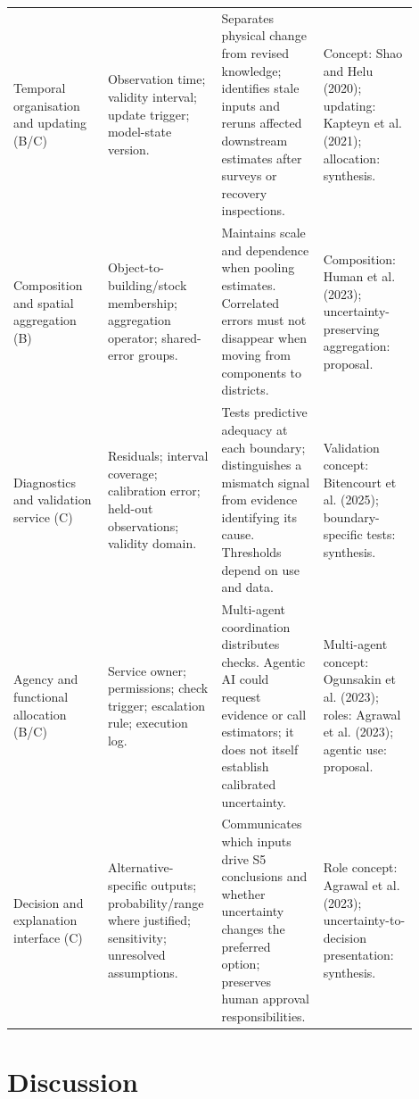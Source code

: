\begin{longtable}{p{0.225\linewidth}p{0.225\linewidth}p{0.225\linewidth}p{0.225\linewidth}}
Temporal organisation and updating (B/C) & Observation time; validity interval; update trigger; model-state version. & Separates physical change from revised knowledge; identifies stale inputs and reruns affected downstream estimates after surveys or recovery inspections. & Concept: Shao and Helu (2020); updating: Kapteyn et al. (2021); allocation: synthesis.\\
Composition and spatial aggregation (B) & Object-to-building/stock membership; aggregation operator; shared-error groups. & Maintains scale and dependence when pooling estimates. Correlated errors must not disappear when moving from components to districts. & Composition: Human et al. (2023); uncertainty-preserving aggregation: proposal.\\
Diagnostics and validation service (C) & Residuals; interval coverage; calibration error; held-out observations; validity domain. & Tests predictive adequacy at each boundary; distinguishes a mismatch signal from evidence identifying its cause. Thresholds depend on use and data. & Validation concept: Bitencourt et al. (2025); boundary-specific tests: synthesis.\\
Agency and functional allocation (B/C) & Service owner; permissions; check trigger; escalation rule; execution log. & Multi-agent coordination distributes checks. Agentic AI could request evidence or call estimators; it does not itself establish calibrated uncertainty. & Multi-agent concept: Ogunsakin et al. (2023); roles: Agrawal et al. (2023); agentic use: proposal.\\
Decision and explanation interface (C) & Alternative-specific outputs; probability/range where justified; sensitivity; unresolved assumptions. & Communicates which inputs drive S5 conclusions and whether uncertainty changes the preferred option; preserves human approval responsibilities. & Role concept: Agrawal et al. (2023); uncertainty-to-decision presentation: synthesis.\\
\bottomrule
\end{longtable}

\section{Discussion}

